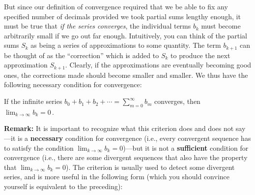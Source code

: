 {{{{\noindent
\begin{center}
\end{center}


But since our definition of convergence required that we be able to fix any 
specified number of decimals provided we took partial sums lengthy enough, it must be true that {\em if the series converges}, 
the individual terms $b_k$ must become arbitrarily small if we go out far enough. Intuitively, you can think of the partial sums $S_k$ as being a series of approximations to some quantity.  The term $b_{k+1}$ can be thought of as the ``correction'' which is added to $S_k$ to produce the next approximation $S_{k+1}$.  Clearly, if the approximations are eventually becoming good ones, the corrections made should become smaller and smaller.  We thus have the following necessary condition for convergence:

\noindent
\begin{center}
\framebox
{ \parbox{2.4in}{\vspace{8pt}
If the infinite series 
   $\displaystyle b_0 + b_1 + b_2 + \cdots= \sum_{m=0}^\infty b_m$
    converges, then
    $\displaystyle \lim_{k\rightarrow \infty} b_k = 0 \, .$}
}
\end{center}

\newpage

{\bf Remark:}  It is important to recognize what this criterion does and does 
not say---it is a {\bf necessary} condition for convergence (i.e., every convergent sequence has to satisfy the condition $\lim_{k\rightarrow \infty} b_k = 0$)---but it is not a {\bf sufficient} condition for convergence (i.e., there are some divergent sequences that also have the property that  $\lim_{k\rightarrow \infty} b_k = 0$).  The criterion is usually used to detect some divergent series, and is more useful in the following form (which you should convince yourself is equivalent to the preceding):

\noindent
\begin{center}
\end{center}}}}}
